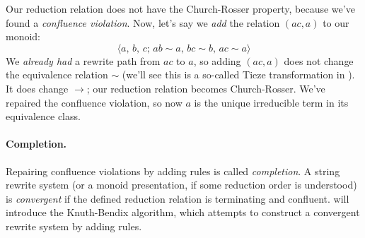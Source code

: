 \documentclass[../generics]{subfiles}
\begin{document}
\begin{example}
\begin{quote}
\end{quote}
Our reduction relation does not have the Church-Rosser property, because we've found a \emph{confluence violation}. Now, let's say we \emph{add} the relation $(ac,a)$ to our monoid:
\[\langle a,\,b,\,c;\,ab\sim a,\,bc\sim b,\,ac\sim a\rangle\]
We \emph{already had} a rewrite path from $ac$ to $a$, so adding $(ac, a)$ does not change the equivalence relation $\sim$ (we'll see this is a so-called Tieze transformation in ). It does change $\rightarrow$; our reduction relation becomes Church-Rosser. We've repaired the confluence violation, so now $a$ is the unique irreducible term in its equivalence class.
\end{example}
\paragraph{Completion.} Repairing confluence violations by adding rules is called \emph{completion}. A string rewrite system (or a monoid presentation, if some reduction order is understood) is \emph{convergent} if the defined reduction relation is terminating and confluent.  will introduce the Knuth-Bendix algorithm, which attempts to construct a convergent rewrite system by adding rules.
\end{document}
